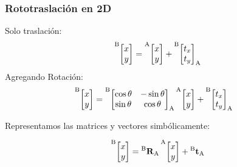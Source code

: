 \begin{frame}
    \frametitle{Rototraslación en 2D}
\scriptsize
Solo traslación:
    \begin{equation*}
        \toCoord{\begin{bmatrix}
            x\\
            y
        \end{bmatrix}}{B} =
        \toCoord{\begin{bmatrix}
            x\\
            y
        \end{bmatrix}}{A} +
        \toCoord{\fromCoord{\begin{bmatrix}
            t_{x}\\
            t_{y}
        \end{bmatrix}}{A}}{B}
    \end{equation*}
Agregando Rotación:
    \begin{align*}
        \toCoord{\begin{bmatrix}
            x\\
            y
        \end{bmatrix}}{B} &=
       \toCoord{\fromCoord{\begin{bmatrix}
                                \cos \theta & -\sin \theta \\
                                \sin \theta & \cos \theta
                            \end{bmatrix}}{A}}{B}
        \toCoord{\begin{bmatrix}
            x\\
            y
        \end{bmatrix}}{A} +
        \toCoord{\fromCoord{\begin{bmatrix}
            t_{x}\\
            t_{y}
        \end{bmatrix}}{A}}{B}
    \end{align*}

Representamos las matrices y vectores simbólicamente:

    \begin{equation*}
        \toCoord{\begin{bmatrix}
            x\\
            y
        \end{bmatrix}}{B} = \rotationCoord{B}{A}
        \toCoord{\begin{bmatrix}
            x\\
            y
        \end{bmatrix}}{A} + \translationCoord{B}{A}
    \end{equation*}


\end{frame}
